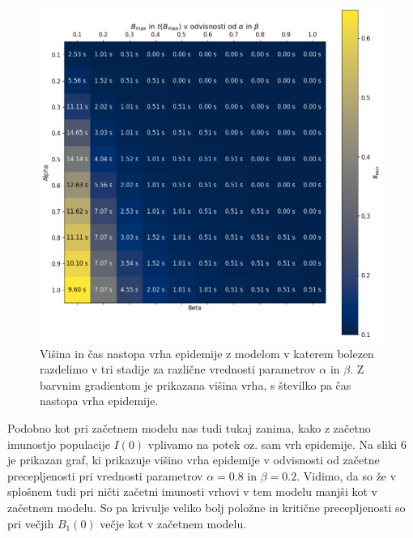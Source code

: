 \documentclass[slovene,11pt,a4paper]{article}
\begin{document}
\begin{figure}[h!]
\centering
\includegraphics[width=13.5cm]{stadiji2.png}
\caption{Višina in čas nastopa vrha epidemije z modelom v katerem bolezen razdelimo v tri stadije za različne vrednosti parametrov $\alpha$ in $\beta$. Z barvnim gradientom je prikazana višina vrha, s številko pa čas nastopa vrha epidemije.}
\end{figure}

Podobno kot pri začetnem modelu nas tudi tukaj zanima, kako z začetno imunostjo populacije $I(0)$ vplivamo na potek oz. sam vrh epidemije. Na sliki 6 je prikazan graf, ki prikazuje višino vrha epidemije v odvisnosti od začetne precepljenosti pri vrednosti parametrov $\alpha = 0.8$ in $\beta = 0.2$. Vidimo, da so že v splošnem tudi pri ničti začetni imunosti vrhovi v tem modelu manjši kot v začetnem modelu. So pa krivulje veliko bolj položne in kritične precepljenosti so pri večjih $B_1(0)$ večje kot v začetnem modelu.

\newpage
\end{document}
